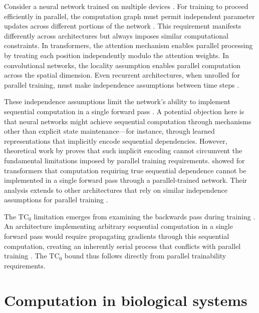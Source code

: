 \documentclass[12pt]{article}
\begin{document}
Consider a neural network trained on multiple devices \cite{zhao2024epha}.
For training to proceed efficiently in parallel, the computation graph must permit independent parameter updates across different portions of the network \cite{barrett2019analyzing}.
This requirement manifests differently across architectures but always imposes similar computational constraints.
In transformers, the attention mechanism enables parallel processing by treating each position independently modulo the attention weights.
In convolutional networks, the locality assumption enables parallel computation across the spatial dimension.
Even recurrent architectures, when unrolled for parallel training, must make independence assumptions between time steps \cite{dickson2023rnns}.

These independence assumptions limit the network's ability to implement sequential computation in a single forward pass \cite{wei2022chain}. A potential objection here is that neural networks might achieve sequential computation through mechanisms other than explicit state maintenance---for instance, through learned representations that implicitly encode sequential dependencies. However, theoretical work by \cite{merrill2023parallelism} proves that such implicit encoding cannot circumvent the fundamental limitations imposed by parallel training requirements.
\cite{merrill2023parallelism} showed for transformers that computation requiring true sequential dependence cannot be implemented in a single forward pass through a parallel-trained network.
Their analysis extends to other architectures that rely on similar independence assumptions for parallel training \cite{stillman2023generative}.

The $\text{TC}_0$ limitation emerges from examining the backwards pass during training \cite{jung2020new}.
An architecture implementing arbitrary sequential computation in a single forward pass would require propagating gradients through this sequential computation, creating an inherently serial process that conflicts with parallel training \cite{zhu2024overcoming}.
The $\text{TC}_0$ bound thus follows directly from parallel trainability requirements.

\section{Computation in biological systems}
\end{document}
